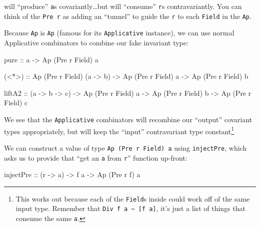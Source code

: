 \documentclass[]{article}
\newenvironment{Shaded}{}{}
\newcommand{\DataTypeTok}[1]{\textcolor[rgb]{0.56,0.13,0.00}{#1}}
\newcommand{\FunctionTok}[1]{\textcolor[rgb]{0.02,0.16,0.49}{#1}}
\newcommand{\NormalTok}[1]{#1}
\newcommand{\OperatorTok}[1]{\textcolor[rgb]{0.40,0.40,0.40}{#1}}
\newcommand{\OtherTok}[1]{\textcolor[rgb]{0.00,0.44,0.13}{#1}}
\begin{document}
will ``produce'' \texttt{a}s covariantly\ldots but will ``consume'' \texttt{r}s
contravariantly. You can think of the \texttt{Pre\ r} as adding an ``tunnel'' to
guide the \texttt{r} to each \texttt{Field} in the \texttt{Ap}.

Because \texttt{Ap} is \texttt{Ap} (famous for its \texttt{Applicative}
instance), we can use normal Applicative combinators to combine our fake
invariant type:

\begin{Shaded}
\begin{Highlighting}[]
\FunctionTok{pure}\OtherTok{ ::}\NormalTok{ a }\OtherTok{{-}>} \DataTypeTok{Ap}\NormalTok{ (}\DataTypeTok{Pre}\NormalTok{ r }\DataTypeTok{Field}\NormalTok{) a}

\NormalTok{(}\OperatorTok{<*>}\NormalTok{)}
\OtherTok{    ::} \DataTypeTok{Ap}\NormalTok{ (}\DataTypeTok{Pre}\NormalTok{ r }\DataTypeTok{Field}\NormalTok{) (a }\OtherTok{{-}>}\NormalTok{ b)}
    \OtherTok{{-}>} \DataTypeTok{Ap}\NormalTok{ (}\DataTypeTok{Pre}\NormalTok{ r }\DataTypeTok{Field}\NormalTok{) a}
    \OtherTok{{-}>} \DataTypeTok{Ap}\NormalTok{ (}\DataTypeTok{Pre}\NormalTok{ r }\DataTypeTok{Field}\NormalTok{) b}

\NormalTok{liftA2}
\OtherTok{    ::}\NormalTok{ (a }\OtherTok{{-}>}\NormalTok{ b }\OtherTok{{-}>}\NormalTok{ c)}
    \OtherTok{{-}>} \DataTypeTok{Ap}\NormalTok{ (}\DataTypeTok{Pre}\NormalTok{ r }\DataTypeTok{Field}\NormalTok{) a}
    \OtherTok{{-}>} \DataTypeTok{Ap}\NormalTok{ (}\DataTypeTok{Pre}\NormalTok{ r }\DataTypeTok{Field}\NormalTok{) b}
    \OtherTok{{-}>} \DataTypeTok{Ap}\NormalTok{ (}\DataTypeTok{Pre}\NormalTok{ r }\DataTypeTok{Field}\NormalTok{) c}
\end{Highlighting}
\end{Shaded}

We see that the \texttt{Applicative} combinators will recombine our ``output''
covariant types appropriately, but will keep the ``input'' contravariant type
constant\footnote{This works out because each of the \texttt{Field}s inside
  could work off of the same input type. Remember that
  \texttt{Div\ f\ a\ \textasciitilde{}\ {[}f\ a{]}}, it's just a list of things
  that consume the same \texttt{a}.}

We can construct a value of type \texttt{Ap\ (Pre\ r\ Field)\ a} using
\texttt{injectPre}, which asks us to provide that ``get an \texttt{a} from
\texttt{r}'' function up-front:

\begin{Shaded}
\begin{Highlighting}[]
\OtherTok{injectPre ::}\NormalTok{ (r }\OtherTok{{-}>}\NormalTok{ a) }\OtherTok{{-}>}\NormalTok{ f a }\OtherTok{{-}>} \DataTypeTok{Ap}\NormalTok{ (}\DataTypeTok{Pre}\NormalTok{ r f) a}
\end{Highlighting}
\end{Shaded}
\end{document}
